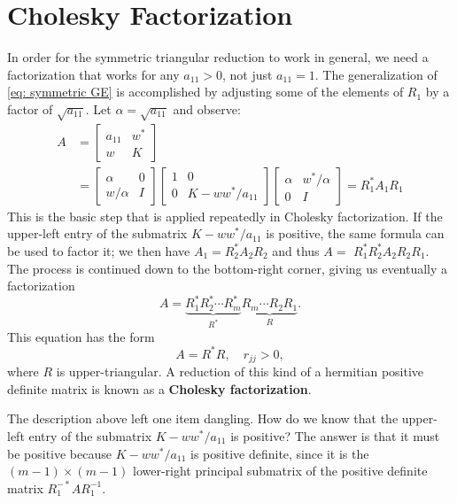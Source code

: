 \section{Cholesky Factorization}
In order for the symmetric triangular reduction to work in general, we need a factorization that works for any $a_{11}>0$, not just $a_{11}=1$. The generalization of \eqref{eq: symmetric GE} is accomplished by adjusting some of the elements of $R_1$ by a factor of $\sqrt{a_{11}}$. Let $\alpha=\sqrt{a_{11}}$ and observe:
$$
\begin{aligned}
A & =\left[\begin{array}{cc}
a_{11} & w^* \\
w & K
\end{array}\right] \\
& =\left[\begin{array}{cc}
\alpha & 0 \\
w / \alpha & I
\end{array}\right]\left[\begin{array}{cc}
1 & 0 \\
0 & K-w w^* / a_{11}
\end{array}\right]\left[\begin{array}{cc}
\alpha & w^* / \alpha \\
0 & I
\end{array}\right]=R_1^* A_1 R_1
\end{aligned}
$$
This is the basic step that is applied repeatedly in Cholesky factorization. If the upper-left entry of the submatrix $K-w w^* / a_{11}$ is positive, the same formula can be used to factor it; we then have $A_1=R_2^* A_2 R_2$ and thus $A=$ $R_1^* R_2^* A_2 R_2 R_1$. The process is continued down to the bottom-right corner, giving us eventually a factorization
\begin{equation}
\label{eq: extend cholesky factor}
A=\underbrace{R_1^* R_2^* \cdots R_m^*}_{R^*} \underbrace{R_m \cdots R_2 R_1}_R.     
\end{equation}
This equation has the form
\begin{equation}
\label{eq: cholesky factor}
A=R^* R, \quad r_{j j}>0,    
\end{equation}
where $R$ is upper-triangular. A reduction of this kind of a hermitian positive definite matrix is known as a \textbf{Cholesky factorization}.

The description above left one item dangling. How do we know that the upper-left entry of the submatrix $K-w w^* / a_{11}$ is positive? The answer is that it must be positive because $K-w w^* / a_{11}$ is positive definite, since it is the $(m-1) \times(m-1)$ lower-right principal submatrix of the positive definite matrix $R_1^{-*} A R_1^{-1}$.



